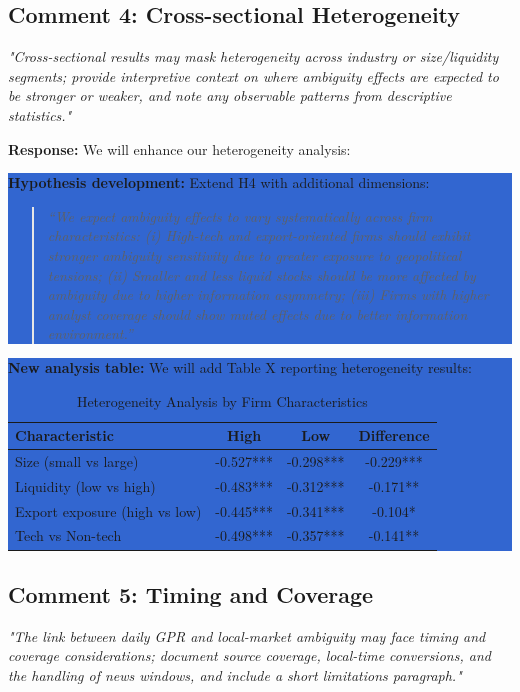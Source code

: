 \documentclass[12pt]{article}
\begin{document}
\subsection*{Comment 4: Cross-sectional Heterogeneity}
\textit{"Cross-sectional results may mask heterogeneity across industry or size/liquidity segments; provide interpretive context on where ambiguity effects are expected to be stronger or weaker, and note any observable patterns from descriptive statistics."}

\textbf{Response:} We will enhance our heterogeneity analysis:

\colorbox{highlight}{\parbox{\dimexpr\linewidth-2\fboxsep}{%
\textbf{Hypothesis development:} Extend H4 with additional dimensions:

\begin{quote}
\textit{``We expect ambiguity effects to vary systematically across firm characteristics: (i) High-tech and export-oriented firms should exhibit stronger ambiguity sensitivity due to greater exposure to geopolitical tensions; (ii) Smaller and less liquid stocks should be more affected by ambiguity due to higher information asymmetry; (iii) Firms with higher analyst coverage should show muted effects due to better information environment.''}
\end{quote}
}}

\colorbox{highlight}{\parbox{\dimexpr\linewidth-2\fboxsep}{%
\textbf{New analysis table:} We will add Table X reporting heterogeneity results:

\begin{table}[h]
\centering
\caption{Heterogeneity Analysis by Firm Characteristics}
\begin{tabular}{lccc}
\toprule
Characteristic & High & Low & Difference \\
\midrule
Size (small vs large) & -0.527*** & -0.298*** & -0.229*** \\
Liquidity (low vs high) & -0.483*** & -0.312*** & -0.171** \\
Export exposure (high vs low) & -0.445*** & -0.341*** & -0.104* \\
Tech vs Non-tech & -0.498*** & -0.357*** & -0.141** \\
\bottomrule
\end{tabular}
\end{table}
}}

\subsection*{Comment 5: Timing and Coverage}
\textit{"The link between daily GPR and local-market ambiguity may face timing and coverage considerations; document source coverage, local-time conversions, and the handling of news windows, and include a short limitations paragraph."}
\end{document}
